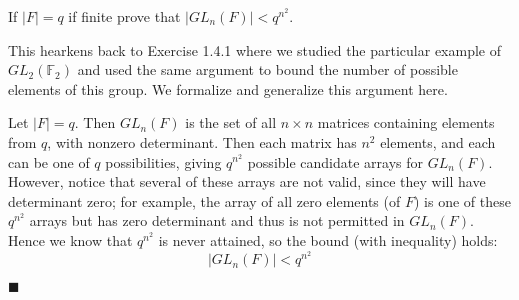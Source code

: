 \documentclass[12pt]{article}
\renewcommand{\qed}{\hfill$\blacksquare$}
\renewenvironment{proof}{\begin{addmargin}[1em]{0em}\begin{newproof}}{\end{newproof}\end{addmargin}\qed}
\newenvironment{problem}[2][Exercise]{\begin{trivlist}
\item[\hskip \labelsep {\bfseries #1}\hskip \labelsep {\bfseries #2.}]}{\end{trivlist}}
\begin{document}
\begin{problem}{1.4.6}
If $\left|F\right|=q$ if finite prove that $\left|GL_n\left(F\right)\right|<q^{n^2}$.
\end{problem}
This hearkens back to Exercise 1.4.1 where we studied the particular example of $GL_2\left(\mathbb{F}_2\right)$ and used the same argument to bound the number of possible elements of this group. We formalize and generalize this argument here.\\
\begin{proof}
Let $\left|F\right|=q$. Then $GL_n\left(F\right)$ is the set of all $n\times n$ matrices containing elements from $q$, with nonzero determinant. Then each matrix has $n^2$ elements, and each can be one of $q$ possibilities, giving $q^{n^2}$ possible candidate arrays for $GL_n\left(F\right)$. However, notice that several of these arrays are not valid, since they will have determinant zero; for example, the array of all zero elements (of $F$) is one of these $q^{n^2}$ arrays but has zero determinant and thus is not permitted in $GL_n\left(F\right)$. Hence we know that $q^{n^2}$ is never attained, so the bound (with inequality) holds:
$$ \left|GL_n\left(F\right)\right| < q^{n^2} $$
\end{proof}
\end{document}
